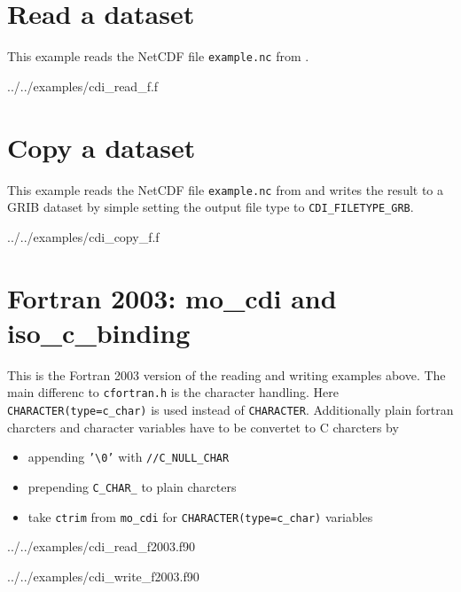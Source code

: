 \section{\label{example_read}Read a dataset}

This example reads the NetCDF file {\tt example.nc} from .


{../../examples/cdi_read_f.f}


\section{Copy a dataset}

This example reads the NetCDF file {\tt example.nc} from 
and writes the result to a GRIB dataset by simple setting the output file type
to {\tt CDI\_FILETYPE\_GRB}.


{../../examples/cdi_copy_f.f}

\section{\label{examples_f2003}Fortran 2003: mo\_cdi and iso\_c\_binding}

This is the Fortran 2003 version of the reading and writing examples above.
The main differenc to {\tt cfortran.h} is the
character handling. Here {\tt CHARACTER(type=c\_char)} is used instead of
{\tt CHARACTER}. Additionally plain fortran charcters and character variables
have to be convertet to C charcters by
\begin{itemize}
\item appending {\tt '\textbackslash 0'} with {\tt //C\_NULL\_CHAR} 
\item prepending {\tt C\_CHAR\_} to plain charcters
\item take {\tt ctrim} from {\tt mo\_cdi} for {\tt CHARACTER(type=c\_char)} variables
\end{itemize}


{../../examples/cdi_read_f2003.f90}


{../../examples/cdi_write_f2003.f90}
